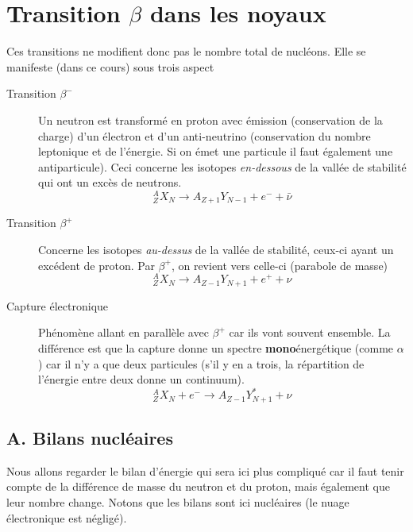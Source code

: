 \section{Transition $\beta$ dans les noyaux}
Ces transitions ne modifient donc pas le nombre total de nucléons. Elle se manifeste (dans ce cours) sous 
trois aspect
\begin{description}
\item[Transition $\beta^-$]  Un neutron est transformé en proton avec émission (conservation de la charge) d'un 
électron et d'un anti-neutrino (conservation du nombre leptonique et de l'énergie. Si on émet une particule il
faut également une antiparticule). Ceci concerne les isotopes \textit{en-dessous} de la vallée de stabilité qui ont
un excès de neutrons.
\begin{equation}
^A_ZX_N \to A_{Z+1}Y_{N-1} + e^- + \bar \nu
\end{equation}
\item[Transition $\beta^+$] Concerne les isotopes \textit{au-dessus} de la vallée de stabilité, ceux-ci ayant un
excédent de proton. Par $\beta^+$, on revient vers celle-ci (parabole de masse)
\begin{equation}
^A_ZX_N \to A_{Z-1}Y_{N+1} + e^+ + \nu
\end{equation}
\item[Capture électronique] Phénomène allant en parallèle avec $\beta^+$ car ils vont souvent ensemble. La différence
est que la capture donne un spectre \textbf{mono}énergétique (comme $\alpha$) car il n'y a que deux particules 
(s'il y en a trois, la répartition de l'énergie entre deux donne un continuum).
\begin{equation}
^A_ZX_N +e^- \to A_{Z-1}Y_{N+1}^*  + \nu
\end{equation}
\end{description}

\subsection{A. Bilans nucléaires}
Nous allons regarder le bilan d'énergie qui sera ici plus compliqué car il faut tenir compte de la différence
de masse du neutron et du proton, mais également que leur nombre change. Notons que les bilans sont ici 
nucléaires (le nuage électronique est négligé).

